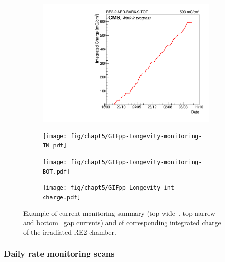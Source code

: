 	\begin{figure}[H]
    	\begin{subfigure}{0.5\linewidth}
			\centering
    		\includegraphics[width = \linewidth]{fig/chapt5/GIFpp-Longevity-monitoring-TW.pdf}
        	\caption{\label{fig:Longevity:A}}
    	\end{subfigure}
    	\begin{subfigure}{0.5\linewidth}
			\centering
    		\texttt{[image: fig/chapt5/GIFpp-Longevity-monitoring-TN.pdf]}
        	\caption{\label{fig:Longevity:B}}
    	\end{subfigure}
    	\begin{subfigure}{0.5\linewidth}
			\centering
    		\texttt{[image: fig/chapt5/GIFpp-Longevity-monitoring-BOT.pdf]}
        	\caption{\label{fig:Longevity:C}}
    	\end{subfigure}
    	\begin{subfigure}{0.5\linewidth}
			\centering
    		\texttt{[image: fig/chapt5/GIFpp-Longevity-int-charge.pdf]}
        	\caption{\label{fig:Longevity:D}}
    	\end{subfigure}
		\caption{\label{fig:Longevity} Example of current monitoring summary (top wide~, top narrow~ and bottom~ gap currents) and of corresponding integrated charge~ of the irradiated RE2 chamber.}
	\end{figure}
\vfill
	
\newpage
	
		\subsubsection{Daily rate monitoring scans}
		\label{chapt5:sssec:dailyratescan}
	
